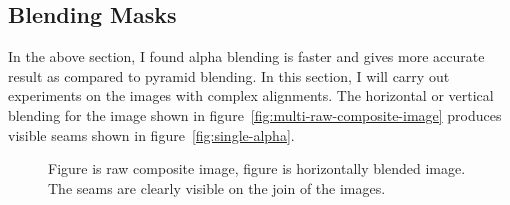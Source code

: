 \subsection{Blending Masks}
In the above section, I found alpha blending is faster and gives more accurate result as compared to pyramid blending. In this section, I will carry out experiments on the images with complex alignments. The horizontal or vertical blending for the image shown in figure~\ref{fig:multi-raw-composite-image} produces visible seams shown in figure~\ref{fig:single-alpha}.\\

\begin{figure}[H]%
\centering
{}
\caption[Complex Alignment]{Figure  is raw composite image, figure  is horizontally blended image. The seams are clearly visible on the join of the images.}%
\label{fig:blending-complex-alignment}%
\end{figure} 

